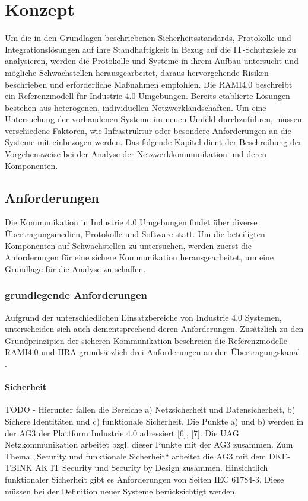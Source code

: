 \chapter{Konzept}

Um die in den Grundlagen beschriebenen Sicherheitsstandards, Protokolle und Integrationslösungen auf ihre Standhaftigkeit in Bezug auf die IT-Schutzziele zu analysieren, werden die Protokolle und Systeme in ihrem Aufbau untersucht und mögliche Schwachstellen herausgearbeitet, daraus hervorgehende Risiken beschrieben und erforderliche Maßnahmen empfohlen. Die \ac{RAMI4.0} beschreibt ein Referenzmodell für Industrie 4.0 Umgebungen. Bereits etablierte Lösungen bestehen aus heterogenen, individuellen Netzwerklandschaften. Um eine Untersuchung der vorhandenen Systeme im neuen Umfeld durchzuführen, müssen verschiedene Faktoren, wie Infrastruktur oder besondere Anforderungen an die Systeme mit einbezogen werden. Das folgende Kapitel dient der Beschreibung der Vorgehensweise bei der Analyse der Netzwerkkommunikation und deren Komponenten.

\section{Anforderungen}
Die Kommunikation in Industrie 4.0 Umgebungen findet über diverse Übertragungsmedien, Protokolle und Software statt. Um die beteiligten Komponenten auf Schwachstellen zu untersuchen, werden zuerst die Anforderungen für eine sichere Kommunikation herausgearbeitet, um eine Grundlage für die Analyse zu schaffen.

\subsection{grundlegende Anforderungen}
Aufgrund der unterschiedlichen Einsatzbereiche von Industrie 4.0 Systemen, unterscheiden sich auch dementsprechend deren Anforderungen. Zusätzlich zu den Grundprinzipien der sicheren Kommunikation beschreien die Referenzmodelle \ac{RAMI4.0} und \ac{IIRA} grundsätzlich drei Anforderungen an den Übertragungskanal \cite{BMWiNeCon2016}.

\subsubsection{Sicherheit}
TODO - Hierunter fallen die Bereiche a) Netzsicherheit und Datensicherheit, b) Sichere Identitäten und c) funktionale Sicherheit. Die Punkte a) und b) werden in der AG3 der Plattform Industrie 4.0 adressiert [6], [7]. Die UAG Netzkommunikation arbeitet bzgl. dieser Punkte mit der AG3 zusammen. Zum Thema „Security und funktionale Sicherheit“ arbeitet die AG3 mit dem DKE-TBINK AK IT Security und Security by Design zusammen. Hinsichtlich funktionaler Sicherheit gibt es Anforderungen von Seiten IEC 61784-3. Diese müssen bei der Definition neuer Systeme berücksichtigt werden.

